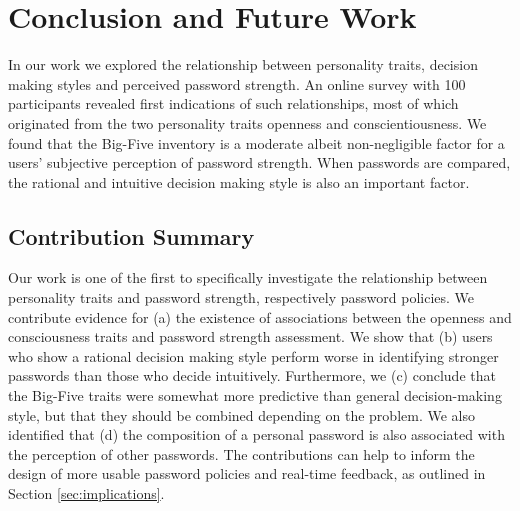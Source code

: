 
\section{Conclusion and Future Work}
In our work we explored the relationship between personality traits, decision making styles and perceived password strength. An online survey with 100 participants revealed first indications of such relationships, most of which originated from the two personality traits openness and conscientiousness. We found that the Big-Five inventory is a moderate albeit non-negligible factor for a users' subjective perception of password strength. When passwords are compared, the rational and intuitive decision making style is also an important factor. 

\subsection{Contribution Summary}
Our work is one of the first to specifically investigate the relationship between personality traits and password strength, respectively password policies. We contribute evidence for (a) the existence of associations between the openness and consciousness traits and password strength assessment. We show that (b) users who show a rational decision making style perform worse in identifying stronger passwords than those who decide intuitively. Furthermore, we (c) conclude that the Big-Five traits were somewhat more predictive than general decision-making style, but that they should be combined depending on the problem. We also identified that (d) the composition of a personal password is also associated with the perception of other passwords. The contributions can help to inform the design of more usable password policies and real-time feedback, as outlined in Section \ref{sec:implications}.

